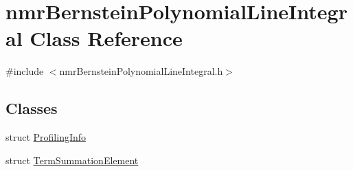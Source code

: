 \hypertarget{classnmr_bernstein_polynomial_line_integral}{}\section{nmr\+Bernstein\+Polynomial\+Line\+Integral Class Reference}
\label{classnmr_bernstein_polynomial_line_integral}


{\ttfamily \#include $<$nmr\+Bernstein\+Polynomial\+Line\+Integral.\+h$>$}

\subsection*{Classes}
\begin{DoxyCompactItemize}
\item 
struct \hyperlink{structnmr_bernstein_polynomial_line_integral_1_1_profiling_info}{Profiling\+Info}
\item 
struct \hyperlink{structnmr_bernstein_polynomial_line_integral_1_1_term_summation_element}{Term\+Summation\+Element}
\end{DoxyCompactItemize}
